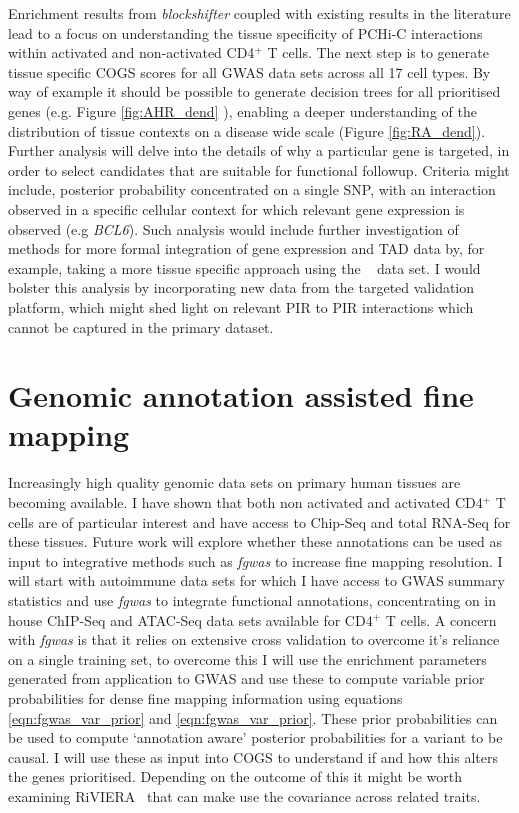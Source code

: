 \documentclass[a4paper,11pt]{report}
\begin{document}
Enrichment results from \textit{blockshifter} coupled with existing results in the literature  lead to a focus on understanding the tissue specificity of PCHi-C interactions within activated and non-activated CD4$^{+}$ T cells. The next step is to generate tissue specific COGS scores for all GWAS data sets across all 17 cell types. By way of example it should be possible to generate decision trees for all prioritised genes (e.g. Figure \ref{fig:AHR_dend} ), enabling a deeper understanding of the distribution of tissue contexts on a disease wide scale (Figure \ref{fig:RA_dend}). Further analysis will delve into the details of why a particular gene is targeted, in order to select candidates that are suitable for functional followup. Criteria might include,  posterior probability concentrated on a single SNP, with an interaction observed in a specific cellular context for which relevant gene expression is observed (e.g \textit{BCL6}). Such analysis would include further investigation of methods for more formal integration of gene expression and TAD data by, for example, taking a more tissue specific approach using the ~\citep{PetersLyonsLeeEtAl2016}  data set. I would bolster this analysis by incorporating new data from the targeted validation platform, which might shed light on relevant PIR to PIR interactions which cannot be captured in the primary dataset.

\section{Genomic annotation assisted fine mapping} 

 Increasingly high quality genomic data sets on primary human tissues are becoming available. I have shown that both non activated and activated CD4$^{+}$ T cells are of particular interest and  have access to Chip-Seq and total RNA-Seq for these tissues. Future work will explore whether these annotations can be used as input to integrative methods such as \textit{fgwas} to increase fine mapping resolution. I will start with autoimmune data sets for which I have access to GWAS summary statistics and use \textit{fgwas} to integrate functional annotations, concentrating on in house ChIP-Seq and ATAC-Seq data sets available for CD4$^{+}$ T cells. A concern with \textit{fgwas} is that it relies on extensive cross validation to overcome it's reliance on a single training set, to overcome this I will use the enrichment parameters generated from application to GWAS and use these to compute variable prior probabilities for dense fine mapping information using equations \ref{eqn:fgwas_var_prior} and \ref{eqn:fgwas_var_prior}. These  prior probabilities can be used to compute `annotation aware' posterior probabilities for a variant to be causal. I will use these as input into COGS to understand if and how this alters the genes prioritised. Depending on the outcome of this it might be worth examining RiVIERA~\citep{LiKellis2016} that can make use the covariance across related traits.
\end{document}
